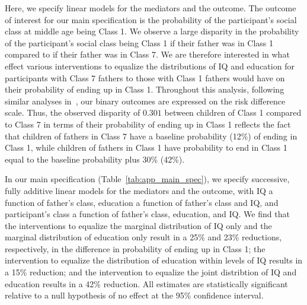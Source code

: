 Here, we specify linear
models for the mediators and the outcome. The outcome of interest for our main specification is the 
probability of the participant's social class at middle age being Class 1. We observe a large disparity in 
the probability of the participant's social class being Class 1 if their 
father was in Class 1 compared to if their father was in Class 7. We are therefore interested in what 
effect various interventions to equalize the distributions of IQ and education for participants with Class 7
fathers to those with Class 1 fathers would have on their probability of ending up in Class 1. Throughout 
this analysis, following similar analyses in~\cite{jacksonvanderweele2018}, our binary outcomes are expressed 
on the risk difference scale. Thus, the observed disparity of $0.301$ between children of Class 1 compared
to Class 7 in terms of their probability of ending up in Class 1 reflects the fact that children of fathers in 
Class 7 have a baseline probability (12\%) of ending in Class 1, while children of fathers in Class 1 have 
probability to end in Class 1 equal to the baseline probability plus 30\% (42\%). 

In our main specification (Table~\ref{tab:app_main_spec}), we specify successive, fully additive linear models for the mediators and the 
outcome, with IQ a function of father's class, education a function of father's class and IQ, and participant's 
class a function of father's class, education, and IQ. We find that the interventions to equalize the marginal 
distribution of IQ only and the marginal 
distribution of education only result in a 25\% and 23\% reductions, respectively, in the difference in probability 
of ending up in Class 1; the intervention to equalize the distribution of education within levels of IQ results 
in a 15\% reduction; and the intervention to equalize the joint distribtion of IQ and education results in a 
42\% reduction. All estimates are statistically significant relative to a null hypothesis of no effect at the 
95\% confidence interval. 

